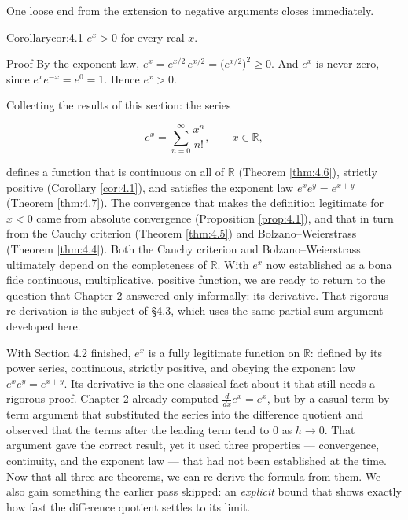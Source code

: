 \documentclass[a4paper,12pt,oneside]{memoir}
\begin{document}
One loose end from the extension to negative arguments closes immediately.

\begin{envcorollary}{Corollary}{cor:4.1}{}
\(e^{x} > 0\) for every real \(x\).
\end{envcorollary}
\begin{envproof}{Proof}{}{}
By the exponent law, \(e^{x} = e^{x/2}\, e^{x/2} = \bigl(e^{x/2}\bigr)^{2} \ge 0\). And \(e^{x}\) is never zero, since \(e^{x} e^{-x} = e^{0} = 1\). Hence \(e^{x} > 0\). \qedmark
\end{envproof}
Collecting the results of this section: the series

\[ e^{x} = \sum_{n=0}^{\infty} \frac{x^{n}}{n!}, \qquad x \in \mathbb{R}, \]

defines a function that is continuous on all of \(\mathbb{R}\) (Theorem \ref{thm:4.6}), strictly positive (Corollary \ref{cor:4.1}), and satisfies the exponent law \(e^{x} e^{y} = e^{x + y}\) (Theorem \ref{thm:4.7}). The convergence that makes the definition legitimate for \(x < 0\) came from absolute convergence (Proposition \ref{prop:4.1}), and that in turn from the Cauchy criterion (Theorem \ref{thm:4.5}) and Bolzano–Weierstrass (Theorem \ref{thm:4.4}). Both the Cauchy criterion and Bolzano–Weierstrass ultimately depend on the completeness of \(\mathbb{R}\). With \(e^{x}\) now established as a bona fide continuous, multiplicative, positive function, we are ready to return to the question that Chapter 2 answered only informally: its derivative. That rigorous re-derivation is the subject of §4.3, which uses the same partial-sum argument developed here.


With Section 4.2 finished, \(e^{x}\) is a fully legitimate function on \(\mathbb{R}\): defined by its power series, continuous, strictly positive, and obeying the exponent law \(e^{x} e^{y} = e^{x + y}\). Its derivative is the one classical fact about it that still needs a rigorous proof. Chapter 2 already computed \(\frac{d}{dx} e^{x} = e^{x}\), but by a casual term-by-term argument that substituted the series into the difference quotient and observed that the terms after the leading term tend to \(0\) as \(h \to 0\). That argument gave the correct result, yet it used three properties — convergence, continuity, and the exponent law — that had not been established at the time. Now that all three are theorems, we can re-derive the formula from them. We also gain something the earlier pass skipped: an \emph{explicit} bound that shows exactly how fast the difference quotient settles to its limit.
\end{document}
